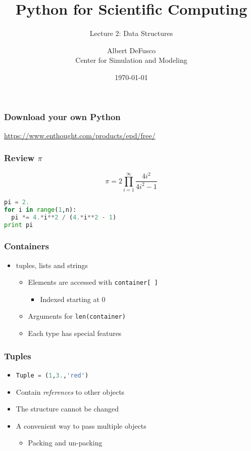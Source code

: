 \documentclass[xcolor=table,10pt,final]{beamer}
\begin{document}
\title{Python for Scientific Computing}
\subtitle{Lecture 2: Data Structures}
\author{Albert DeFusco\\Center for Simulation and Modeling}
\date{\today}
\frame{\titlepage}

\begin{frame}
  \frametitle{Download your own Python}
  \url{https://www.enthought.com/products/epd/free/}
\end{frame}

\begin{frame}[fragile]
  \frametitle{Review $\pi$}
  \begin{equation*}
    \pi = 2\prod^{\infty}_{i=1}\frac{4i^2}{4i^2-1}
  \end{equation*}
  \pause
\begin{lstlisting}[language=Python]
pi = 2.
for i in range(1,n):
  pi *= 4.*i**2 / (4.*i**2 - 1)
print pi
\end{lstlisting}
\end{frame}

\begin{frame}
  \frametitle{Containers}
  \begin{itemize}
    \item tuples, lists and strings
  \begin{itemize}
    \item Elements are accessed with {\tt container[ ]}
      \begin{itemize}
        \item Indexed starting at 0
      \end{itemize}
    \item Arguments for {\tt len(container)}
    \item Each type has special features
  \end{itemize}
  \end{itemize}
\end{frame}

\begin{frame}
  \frametitle{Tuples}
  \begin{itemize}
    \item \lstinline[language=Python]|Tuple = (1,3.,'red')|
    \item Contain {\it references} to other objects
    \item The structure cannot be changed
    \item A convenient way to pass multiple objects
      \begin{itemize}
        \item Packing and un-packing
      \end{itemize}
  \end{itemize}
\end{frame}
\end{document}
